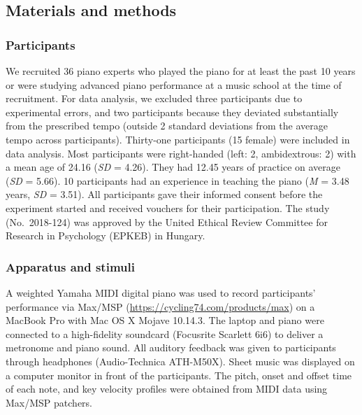 \documentclass[
  man,floatsintext]{apa6}
\begin{document}
\hypertarget{materials-and-methods}{%
\subsection{Materials and methods}\label{materials-and-methods}}

\hypertarget{participants}{%
\subsubsection{Participants}\label{participants}}

We recruited 36 piano experts who played the piano for at least the past 10 years or were studying advanced piano performance at a music school at the time of recruitment. For data analysis, we excluded three participants due to experimental errors, and two participants because they deviated substantially from the prescribed tempo (outside 2 standard deviations from the average tempo across participants). Thirty-one participants (15 female) were included in data analysis. Most participants were right-handed (left: 2, ambidextrous: 2) with a mean age of 24.16 (\emph{SD} = 4.26). They had 12.45 years of practice on average (\emph{SD} = 5.66). 10 participants had an experience in teaching the piano (\emph{M} = 3.48 years, \emph{SD} = 3.51). All participants gave their informed consent before the experiment started and received vouchers for their participation. The study (No.~2018-124) was approved by the United Ethical Review Committee for Research in Psychology (EPKEB) in Hungary.

\hypertarget{apparatus-and-stimuli}{%
\subsubsection{Apparatus and stimuli}\label{apparatus-and-stimuli}}

A weighted Yamaha MIDI digital piano was used to record participants' performance via Max/MSP (\url{https://cycling74.com/products/max}) on a MacBook Pro with Mac OS X Mojave 10.14.3. The laptop and piano were connected to a high-fidelity soundcard (Focusrite Scarlett 6i6) to deliver a metronome and piano sound. All auditory feedback was given to participants through headphones (Audio-Technica ATH-M50X). Sheet music was displayed on a computer monitor in front of the participants. The pitch, onset and offset time of each note, and key velocity profiles were obtained from MIDI data using Max/MSP patchers.
\end{document}
